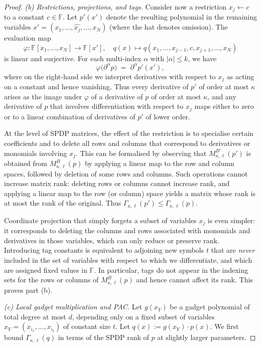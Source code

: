 \documentclass[12pt]{article}
\theoremstyle{definition}
\theoremstyle{definition}
\theoremstyle{remark}
\theoremstyle{remark}
\begin{document}
\begin{proof}
\medskip\noindent
\emph{(b) Restrictions, projections, and tags.}
Consider now a restriction $x_j \gets c$ to a constant $c\in\mathbb{F}$.
Let $p'(x')$ denote the resulting polynomial in the remaining variables
$x' = (x_1,\dots,\widehat{x_j},\dots,x_N)$ (where the hat denotes omission).
The evaluation map
\[
   \varphi : \mathbb{F}[x_1,\dots,x_N] \to \mathbb{F}[x'],\quad
   q(x) \mapsto q(x_1,\dots,x_{j-1},c,x_{j+1},\dots,x_N)
\]
is linear and surjective. For each multi-index $\alpha$ with
$|\alpha|\le k$, we have
\[
   \varphi\bigl(\partial^\alpha p\bigr)
   \;=\; \partial^\alpha p'(x'),
\]
where on the right-hand side we interpret derivatives with respect to
$x_j$ as acting on a constant and hence vanishing. Thus every derivative
of $p'$ of order at most $\kappa$ arises as the image under $\varphi$ of a
derivative of $p$ of order at most $\kappa$, and any derivative of $p$ that
involves differentiation with respect to $x_j$ maps either to zero or to
a linear combination of derivatives of $p'$ of lower order.

At the level of SPDP matrices, the effect of the restriction is to
specialise certain coefficients and to delete all rows and columns that
correspond to derivatives or monomials involving $x_j$. This can be
formalised by observing that $M^{B'}_{\kappa,\ell}(p')$ is obtained from
$M^{B}_{\kappa,\ell}(p)$ by applying a linear map to the row and column
spaces, followed by deletion of some rows and columns. Such operations
cannot increase matrix rank: deleting rows or columns cannot increase
rank, and applying a linear map to the row (or column) space yields a
matrix whose rank is at most the rank of the original. Thus
$\Gamma_{\kappa,\ell}(p') \le \Gamma_{\kappa,\ell}(p)$.

Coordinate projection that simply forgets a subset of variables
$x_j$ is even simpler: it corresponds to deleting the columns and rows
associated with monomials and derivatives in those variables, which can
only reduce or preserve rank. Introducing tag constants is equivalent to
adjoining new symbols $t$ that are \emph{never} included in the set of
variables with respect to which we differentiate, and which are assigned
fixed values in $\mathbb{F}$. In particular, tags do not appear in the
indexing sets for the rows or columns of $M^{B}_{\kappa,\ell}(p)$ and hence
cannot affect its rank. This proves part (b).

\medskip\noindent
\emph{(c) Local gadget multiplication and PAC.}
Let $g(x_Y)$ be a gadget polynomial of total degree at most $d$, depending
only on a fixed subset of variables $x_Y = (x_{i_1},\dots,x_{i_t})$ of
constant size $t$. Let $q(x) := g(x_Y)\cdot p(x)$. We first bound
$\Gamma_{\kappa,\ell}(q)$ in terms of the SPDP rank of $p$ at slightly larger
parameters.


\end{proof}
\end{document}
